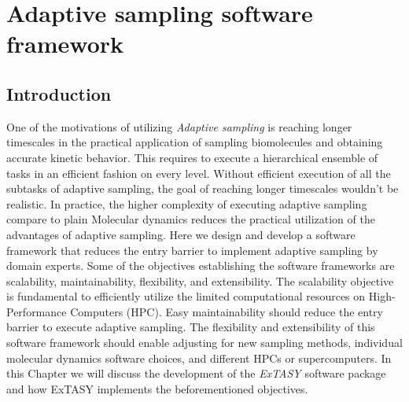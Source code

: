 \afterpage{\null\newpage}
\chapter{Adaptive sampling software framework\label{ch:chapter4}}
\section{\label{sec:intro4}Introduction}

One of the motivations of utilizing \emph{Adaptive sampling} is reaching longer timescales in the practical application of sampling biomolecules and obtaining accurate kinetic behavior. This requires to execute a hierarchical ensemble of tasks in an efficient fashion on every level. Without efficient execution of all the subtasks of adaptive sampling, the goal of reaching longer timescales wouldn't be realistic. In practice, the higher complexity of executing adaptive sampling compare to plain Molecular dynamics reduces the practical utilization of the advantages of adaptive sampling. Here we design and develop a software framework that reduces the entry barrier to implement adaptive sampling by domain experts. Some of the objectives establishing the software frameworks are scalability, maintainability, flexibility, and extensibility.
The scalability objective is fundamental to efficiently utilize the limited computational resources on High-Performance Computers (HPC). Easy maintainability should reduce the entry barrier to execute adaptive sampling. The flexibility and extensibility of this software framework should enable adjusting for new sampling methods, individual molecular dynamics software choices, and different HPCs or supercomputers. In this Chapter we will discuss the development of the \emph{ExTASY} software package and how ExTASY implements the beforementioned objectives.

